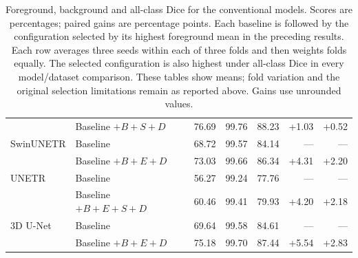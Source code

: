 \documentclass[12pt,a4paper]{article}
\begin{document}
\begin{table}[p]
\begin{tabular}{@{}llrrrrr@{}}
 & Baseline $+B+S+D$ & 76.69 & 99.76 & 88.23 & +1.03 & +0.52 \\
SwinUNETR & Baseline & 68.72 & 99.57 & 84.14 & --- & --- \\
 & Baseline $+B+E+D$ & 73.03 & 99.66 & 86.34 & +4.31 & +2.20 \\
UNETR & Baseline & 56.27 & 99.24 & 77.76 & --- & --- \\
 & Baseline $+B+E+S+D$ & 60.46 & 99.41 & 79.93 & +4.20 & +2.18 \\
3D U-Net & Baseline & 69.64 & 99.58 & 84.61 & --- & --- \\
 & Baseline $+B+E+D$ & 75.18 & 99.70 & 87.44 & +5.54 & +2.83 \\
\hline
\end{tabular}
\caption{Foreground, background and all-class Dice for the conventional
models. Scores are percentages; paired gains are percentage points.
Each baseline is followed by the configuration selected by its highest
foreground mean in the preceding results. Each row averages three seeds
within each of three folds and then weights folds equally. The selected
configuration is also highest under all-class Dice in every model/dataset
comparison. These tables show means; fold variation and the original
selection limitations remain as reported above. Gains use unrounded values.}
\label{tab:background-conventional}
\end{table}
\FloatBarrier
\end{document}
